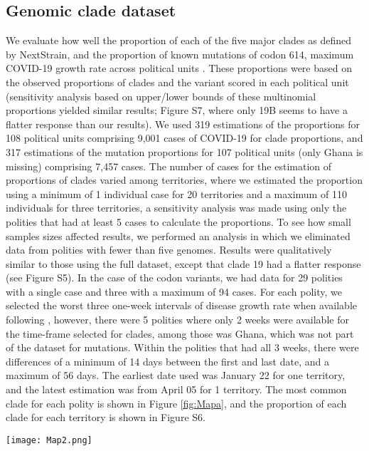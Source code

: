 \documentclass[9pt,twocolumn,twoside,lineno]{pnas-new}
\begin{document}
{\subsection*{Genomic clade dataset}
We evaluate how well the proportion of each of the five major clades as defined by NextStrain, and the proportion of known mutations of codon 614, maximum COVID-19 growth rate across political units \cite{Rambaut2020-km}. These proportions were based on the observed proportions of clades and the variant scored in each political unit (sensitivity analysis based on upper/lower bounds of these multinomial proportions yielded similar results; Figure S7, where only 19B seems to have a flatter response than our results). We used 319 estimations of the proportions for 108 political units comprising 9,001 cases of COVID-19 for clade proportions, and 317 estimations of the mutation proportions for 107 political units (only Ghana is missing) comprising 7,457 cases. The number of cases for the estimation of proportions of clades varied among territories, where we estimated the proportion using a minimum of 1 individual case for 20 territories and a maximum of 110 individuals for three territories, a sensitivity analysis was made using only the polities that had at least 5 cases to calculate the proportions. To see how small samples sizes affected results, we performed an analysis in which we eliminated data from polities with fewer than five genomes. Results were qualitatively similar to those using the full dataset, except that clade 19 had a flatter response (see Figure S5). In the case of the codon variants, we had data for 29 polities with a single case and three with a maximum of 94 cases. For each polity, we selected the worst three one-week intervals of disease growth rate when available following \cite{Merow2020-be}, however, there were 5 polities where only 2 weeks were available for the time-frame selected for clades, among those was Ghana, which was not part of the dataset for mutations. Within the polities that had all 3 weeks, there were differences of a minimum of 14 days between the first and last date, and a maximum of 56 days. The earliest date used was January 22 for one territory, and the latest estimation was from April 05 for 1 territory. The most common clade for each polity is shown in Figure \ref{fig:Mapa}, and the proportion of each clade for each territory is shown in Figure S6.


\begin{SCfigure*}[\sidecaptionrelwidth][t]
\centering
\texttt{[image: Map2.png]}
\caption{Most common clade on each polity as seen in the map, clades  19A and 19B dominate in Oceania and southeast Asia, whereas  clades  20A, 20B and 20C  dominate in South America, Europe and North America.}\label{fig:Mapa}
\end{SCfigure*}


}
\end{document}
